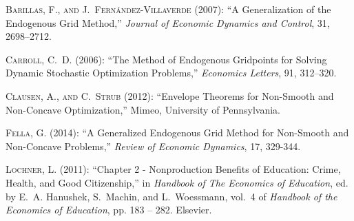 \documentclass[a4paper,dvips,12pt]{article}
\begin{document}

\begin{thebibliography}{xx}

\textsc{Barillas, F.,  {\small and} J.~Fern\'{a}ndez-Villaverde}  (2007): ``A
  Generalization of the Endogenous Grid Method,'' \emph{Journal of Economic
  Dynamics and Control}, 31, 2698--2712.

\textsc{Carroll, C.~D.}  (2006): ``The Method of Endogenous Gridpoints for
  Solving Dynamic Stochastic Optimization Problems,'' \emph{Economics Letters},
  91, 312--320.

\textsc{Clausen, A.,  {\small and} C.~Strub}  (2012): ``Envelope Theorems for
  Non-Smooth and Non-Concave Optimization,'' Mimeo, University of Pennsylvania.

\textsc{Fella, G.}  (2014): ``A Generalized Endogenous Grid Method for
  Non-Smooth and Non-Concave Problems,'' \emph{Review of Economic Dynamics},
17, 329-344.

\textsc{Lochner, L.}  (2011): ``Chapter 2 - Nonproduction Benefits of Education:
  Crime, Health, and Good Citizenship,'' in \emph{Handbook of The Economics of
  Education}, ed. by E.~A. Hanushek, S.~Machin,  {\small and} L.~Woessmann,
  vol.~4 of \emph{Handbook of the Economics of Education}, pp. 183 -- 282.
  Elsevier.

\end{thebibliography}
\end{document}
